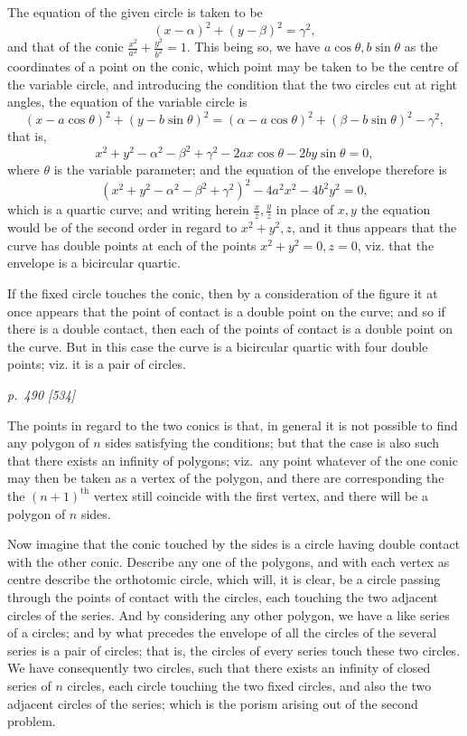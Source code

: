 \documentclass[11pt,a4paper]{article}
\theoremstyle{plain}
\theoremstyle{definition}
\begin{document}
The equation of the given circle is taken to be
\[
        (x-\alpha)^2+(y-\beta)^2=\gamma^2,
\]
and that of the conic $\frac{x^2}{a^2}+\frac{y^2}{b^2}=1$. This being so, we have
$a\cos\theta,b\sin\theta$ as the coordinates of a point on the conic, which point
may be taken to be the centre of the variable circle, and introducing the condition
that the two circles cut at right angles, the equation of the variable circle is
\[
(x-a\cos\theta)^2+(y-b\sin\theta)^2
=(\alpha-a\cos\theta)^2+(\beta-b\sin\theta)^2-\gamma^2,
\]
that is,
\[
        x^2+y^2-\alpha^2-\beta^2+\gamma^2
        -2ax\cos\theta-2by\sin\theta=0,
\]
where $\theta$ is the variable parameter; and the equation of the envelope therefore
is
\[
        (x^2+y^2-\alpha^2-\beta^2+\gamma^2)^2-4a^2x^2-4b^2y^2=0,
\]
which is a quartic curve; and writing herein $\frac{x}{z},\frac{y}{z}$ in place of $x,y$ the equation
would be of the second order in regard to $x^2+y^2,z$, and it thus appears that
the curve has double points at each of the points $x^2+y^2=0,z=0$, viz. that the
envelope is a bicircular quartic.

If the fixed circle touches the conic, then by a consideration of the figure it at
once appears that the point of contact is a double point on the curve; and so if
there is a double contact, then each of the points of contact is a double point on
the curve. But in this case the curve is a bicircular quartic with four double points;
viz. it is a pair of circles.

\clearpage

\bigskip
\textit{p.~490 [534]}
\smallskip

\noindent
The points in regard to the two conics is that, in general it is not possible to
find any polygon of $n$ sides satisfying the conditions; but that the case is also
such that there exists an infinity of polygons; viz.\ any point whatever of the one
conic may then be taken as a vertex of the polygon, and there are corresponding the
the $(n+1)^{\text{th}}$ vertex still coincide with the first vertex, and there will be a polygon of
$n$ sides.

Now imagine that the conic touched by the sides is a circle having double contact
with the other conic. Describe any one of the polygons, and with each vertex as
centre describe the orthotomic circle, which will, it is clear, be a circle passing
through the points of contact with the circles, each touching the two adjacent circles of
the series. And by considering any other polygon, we have a like series of a circles;
and by what precedes the envelope of all the circles of the several series is a pair of
circles; that is, the circles of every series touch these two circles. We have consequently
two circles, such that there exists an infinity of closed series of $n$ circles, each circle
touching the two fixed circles, and also the two adjacent circles of the series; which
is the porism arising out of the second problem.
\end{document}
